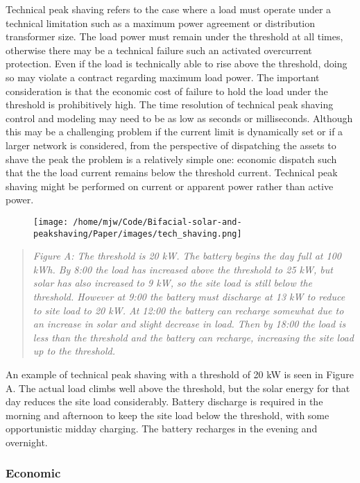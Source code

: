 \documentclass[
]{article}
\begin{document}
Technical peak shaving refers to the case where a load must operate
under a technical limitation such as a maximum power agreement or
distribution transformer size. The load power must remain under the
threshold at all times, otherwise there may be a technical failure such
an activated overcurrent protection. Even if the load is technically
able to rise above the threshold, doing so may violate a contract
regarding maximum load power. The important consideration is that the
economic cost of failure to hold the load under the threshold is
prohibitively high. The time resolution of technical peak shaving
control and modeling may need to be as low as seconds or milliseconds.
Although this may be a challenging problem if the current limit is
dynamically set or if a larger network is considered, from the
perspective of dispatching the assets to shave the peak the problem is a
relatively simple one: economic dispatch such that the the load current
remains below the threshold current. Technical peak shaving might be
performed on current or apparent power rather than active power.

\begin{figure}
\centering
\texttt{[image: /home/mjw/Code/Bifacial-solar-and-peakshaving/Paper/images/tech\_shaving.png]}
\caption{}
\end{figure}

\begin{quote}
\emph{Figure A: The threshold is 20 kW. The battery begins the day full
at 100 kWh. By 8:00 the load has increased above the threshold to 25 kW,
but solar has also increased to 9 kW, so the site load is still below
the threshold. However at 9:00 the battery must discharge at 13 kW to
reduce to site load to 20 kW. At 12:00 the battery can recharge somewhat
due to an increase in solar and slight decrease in load. Then by 18:00
the load is less than the threshold and the battery can recharge,
increasing the site load up to the threshold.}
\end{quote}

An example of technical peak shaving with a threshold of 20 kW is seen
in Figure A. The actual load climbs well above the threshold, but the
solar energy for that day reduces the site load considerably. Battery
discharge is required in the morning and afternoon to keep the site load
below the threshold, with some opportunistic midday charging. The
battery recharges in the evening and overnight.

\hypertarget{economic}{%
\subsubsection{Economic}\label{economic}}
\end{document}
